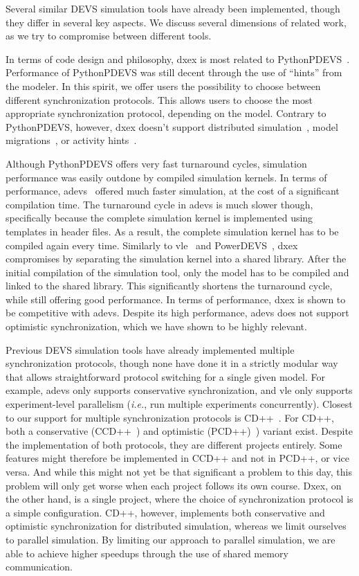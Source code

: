 Several similar \textsf{DEVS} simulation tools have already been implemented, though they differ in several key aspects.
We discuss several dimensions of related work, as we try to compromise between different tools.

In terms of code design and philosophy, dxex is most related to PythonPDEVS~\cite{PythonPDEVS}.
Performance of PythonPDEVS was still decent through the use of ``hints'' from the modeler.
In this spirit, we offer users the possibility to choose between different synchronization protocols.
This allows users to choose the most appropriate synchronization protocol, depending on the model.
Contrary to PythonPDEVS, however, dxex doesn't support distributed simulation~\cite{JDF}, model migrations~\cite{PythonPDEVS2}, or activity hints~\cite{PythonPDEVS_ACTIMS}.

Although PythonPDEVS offers very fast turnaround cycles, simulation performance was easily outdone by compiled simulation kernels.
In terms of performance, adevs~\cite{adevs} offered much faster simulation, at the cost of a significant compilation time.
The turnaround cycle in adevs is much slower though, specifically because the complete simulation kernel is implemented using templates in header files.
As a result, the complete simulation kernel has to be compiled again every time.
Similarly to vle~\cite{vle} and PowerDEVS~\cite{PowerDEVS}, dxex compromises by separating the simulation kernel into a shared library.
After the initial compilation of the simulation tool, only the model has to be compiled and linked to the shared library.
This significantly shortens the turnaround cycle, while still offering good performance.
In terms of performance, dxex is shown to be competitive with adevs.
Despite its high performance, adevs does not support optimistic synchronization, which we have shown to be highly relevant.

Previous \textsf{DEVS} simulation tools have already implemented multiple synchronization protocols, though none have done it in a strictly modular way that allows straightforward protocol switching for a single given model.
For example, adevs only supports conservative synchronization, and vle only supports experiment-level parallelism (\textit{i.e.}, run multiple experiments concurrently).
Closest to our support for multiple synchronization protocols is CD++~\cite{CD++}.
For CD++, both a conservative (CCD++~\cite{CCD++}) and optimistic (PCD++)~\cite{PCD++}) variant exist.
Despite the implementation of both protocols, they are different projects entirely.
Some features might therefore be implemented in CCD++ and not in PCD++, or vice versa.
And while this might not yet be that significant a problem to this day, this problem will only get worse when each project follows its own course.
Dxex, on the other hand, is a single project, where the choice of synchronization protocol is a simple configuration.
CD++, however, implements both conservative and optimistic synchronization for distributed simulation, whereas we limit ourselves to parallel simulation.
By limiting our approach to parallel simulation, we are able to achieve higher speedups through the use of shared memory communication.

